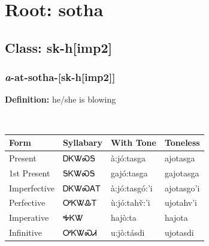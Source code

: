 \needspace{4in}
\section*{Root: sotha}
\nopagebreak
{}
\needspace{3in}
\subsection*{Class: sk-h[imp2]}
\nopagebreak
\needspace{2in}
\subsubsection*{\textit{a}{-}at{-}\textbf{sotha}{-}[sk-h[imp2]]}
\nopagebreak
\textbf{Definition: } he/she is blowing
\\[0.5em]
\begin{tabularx}{\textwidth}{l X X X}%
\toprule%
\textbf{Form}&\textbf{Syllabary}&\textbf{With Tone}&\textbf{Toneless}\\%
\midrule%
Present&ᎠᏦᏔᏍᎦ&à:jó:tasga&ajotasga\\%
1st Present&ᎦᏦᏔᏍᎦ&gajó:tasga&gajotasga\\%
Imperfective&ᎠᏦᏔᏍᎪᎢ&à:jó:tasgó:’i&ajotasgo’i\\%
Perfective&ᎤᏦᏔᎲᎢ&ù:jó:tahv̌:’i&ujotahv’i\\%
Imperative&ᎭᏦᏔ&hajò:ta&hajota\\%
Infinitive&ᎤᏦᏔᏍᏗ&u:jò:tásdi&ujotasdi\\%
\bottomrule%
\end{tabularx}
\\[1em]